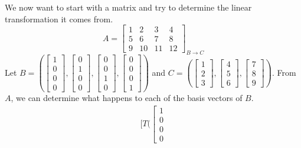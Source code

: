 \begin{example}
    We now want to start with a matrix and try to determine the linear transformation it comes from.
    $$A=\begin{bmatrix}
        1 & 2 & 3 & 4\\
        5 & 6 & 7 & 8\\
        9 & 10 & 11 & 12
    \end{bmatrix}_{B\to C}$$
    Let $B=(\left[\begin{smallmatrix}
        1 \\ 0 \\ 0 \\ 0
    \end{smallmatrix}\right], \left[\begin{smallmatrix}
        0 \\ 1 \\ 0 \\ 0
    \end{smallmatrix}\right], \left[\begin{smallmatrix}
        0 \\ 0 \\ 1 \\ 0
    \end{smallmatrix}\right], \left[\begin{smallmatrix}
        0 \\ 0 \\ 0 \\ 1
    \end{smallmatrix}\right])$ and $C=(\left[\begin{smallmatrix}
        1 \\ 2 \\ 3
    \end{smallmatrix}\right],\left[\begin{smallmatrix}
        4 \\ 5 \\ 6
    \end{smallmatrix}\right],\left[\begin{smallmatrix}
        7 \\ 8 \\ 9
    \end{smallmatrix}\right])$. From $A$, we can determine what happens to each of the basis vectors of $B$.
    \begin{align*}
        [T(\left[\begin{smallmatrix}
        1 \\ 0 \\ 0 \\ 0

\end{smallmatrix}
\end{align*}
\end{example}
